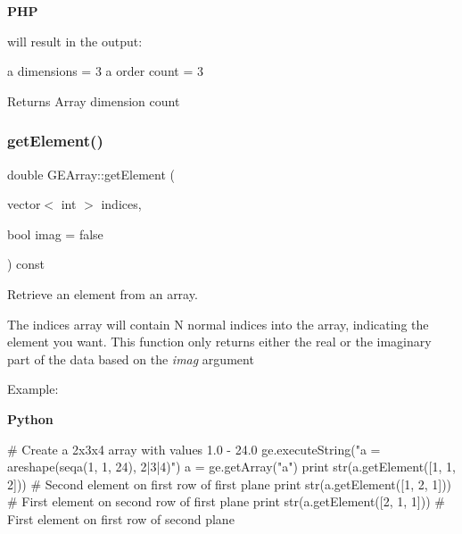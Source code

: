 {\bfseries P\+HP} 
 will result in the output\+: 
\begin{DoxyCode}
a dimensions = 3
a order count = 3
\end{DoxyCode}


\begin{DoxyReturn}{Returns}
Array dimension count 
\end{DoxyReturn}
\mbox{\label{class_g_e_array_a48fc60569350f3522f3bd6d074bd92ec}} 
\subsubsection{\texorpdfstring{get\+Element()}{getElement()}}
{\footnotesize\ttfamily double G\+E\+Array\+::get\+Element (\begin{DoxyParamCaption}\item[{vector$<$ int $>$}]{indices,  }\item[{bool}]{imag = {\ttfamily false} }\end{DoxyParamCaption}) const}



Retrieve an element from an array. 

The indices array will contain N normal indices into the array, indicating the element you want. This function only returns either the real or the imaginary part of the data based on the {\itshape imag} argument

Example\+:

{\bfseries Python} 
\begin{DoxyCode}
\textcolor{comment}{# Create a 2x3x4 array with values 1.0 - 24.0}
ge.executeString(\textcolor{stringliteral}{"a = areshape(seqa(1, 1, 24), 2|3|4)"})
a = ge.getArray(\textcolor{stringliteral}{"a"})
\textcolor{keywordflow}{print} str(a.getElement([1, 1, 2])) \textcolor{comment}{# Second element on first row of first plane}
\textcolor{keywordflow}{print} str(a.getElement([1, 2, 1])) \textcolor{comment}{# First element on second row of first plane}
\textcolor{keywordflow}{print} str(a.getElement([2, 1, 1])) \textcolor{comment}{# First element on first row of second plane}
\end{DoxyCode}



